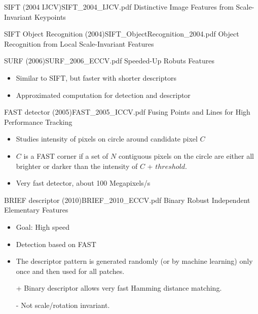 \documentclass[10pt,a4paper]{scrartcl}
\begin{document}
\begin{multicols*}{2}
\begin{Paper}{SIFT (2004 IJCV)}{SIFT_2004_IJCV.pdf}
Distinctive Image Features from Scale-Invariant Keypoints
\end{Paper}

\begin{Paper}{SIFT Object Recognition (2004)}{SIFT_ObjectRecognition_2004.pdf}
Object Recognition from Local Scale-Invariant Features
\end{Paper}

\begin{Paper}{SURF (2006)}{SURF_2006_ECCV.pdf}
Speeded-Up Robuts Features

\begin{itemize}
\item Similar to SIFT, but faster with shorter descriptors
\item Approximated computation for detection and descriptor
\end{itemize}
\end{Paper}

\begin{Paper}{FAST detector (2005)}{FAST_2005_ICCV.pdf}
Fusing Points and Lines for High Performance Tracking

\begin{itemize}
\item Studies intensity of pixels on circle around candidate pixel $C$
\item $C$ is a FAST corner if a set of $N$ contiguous pixels on the circle are either all brighter or darker than the intensity of $C$ + $threshold$.
\item Very fast detector, about 100 Megapixels/s
\end{itemize}
\end{Paper}

\begin{Paper}{BRIEF descriptor (2010)}{BRIEF_2010_ECCV.pdf}
Binary Robust Independent Elementary Features

\begin{itemize}
\item Goal: High speed
\item Detection based on FAST
\item The descriptor pattern is generated randomly (or by machine learning) only once and then used for all patches.
\item[+] Binary descriptor allows very fast Hamming distance matching.
\item[-] Not scale/rotation invariant.
\end{itemize}
\end{Paper}


\end{multicols*}
\end{document}
